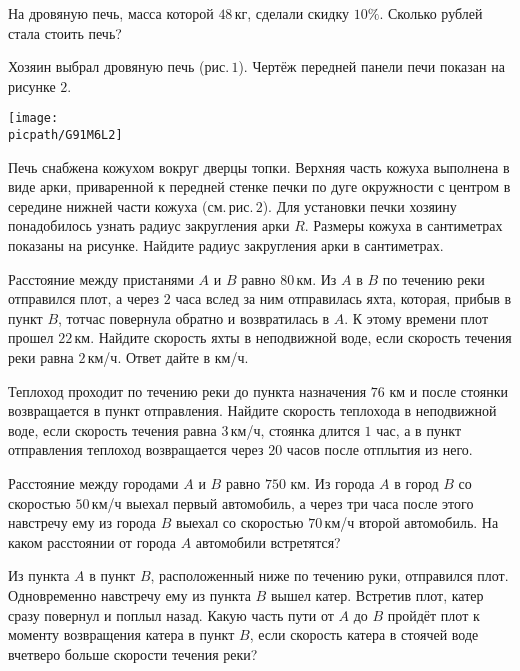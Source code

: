 \begin{class}[number=2]
\begin{listofex}
		\item На дровяную печь, масса которой \( 48 \) кг, сделали скидку \( 10\% \). Сколько рублей стала стоить печь?
		\item Хозяин выбрал дровяную печь (рис. \( 1 \)). Чертёж передней панели печи показан на рисунке \( 2 \).
		\begin{center}
			\texttt{[image: \\picpath/G91M6L2]}
		\end{center}
		Печь снабжена кожухом вокруг дверцы топки. Верхняя часть кожуха выполнена в виде арки, приваренной к передней стенке печки по дуге окружности с центром в середине нижней части кожуха (см. рис. \( 2 \)). Для установки печки хозяину понадобилось узнать радиус закругления арки \( R \). Размеры кожуха в сантиметрах показаны на рисунке. Найдите радиус закругления арки в сантиметрах.
		\item Расстояние между пристанями \( A \) и \( B \) равно \( 80 \) км. Из \( A \) в \( B \) по течению реки отправился плот, а через \( 2 \) часа вслед за ним отправилась яхта, которая, прибыв в пункт \( B \), тотчас повернула обратно и возвратилась в \( A \). К этому времени плот прошел \( 22 \) км. Найдите скорость яхты в неподвижной воде, если скорость течения реки равна \( 2 \) км/ч. Ответ дайте в км/ч.
		\item Теплоход проходит по течению реки до пункта назначения \( 76  \) км и после стоянки возвращается в пункт отправления. Найдите скорость теплохода в неподвижной воде, если скорость течения равна \( 3 \) км/ч, стоянка длится \( 1 \) час, а в пункт отправления теплоход возвращается через \( 20 \) часов после отплытия из него.
		\item Расстояние между городами \( A \) и \( B \) равно \( 750  \) км. Из города \( A \) в город \( B \) со скоростью \( 50 \) км/ч выехал первый автомобиль, а через три часа после этого навстречу ему из города \( B \) выехал со скоростью \( 70 \) км/ч второй автомобиль. На каком расстоянии от города \( A \) автомобили встретятся?
		\item Из пункта \( A \) в пункт \( B \), расположенный ниже по течению руки, отправился плот. Одновременно навстречу ему из пункта \( B \) вышел катер. Встретив плот, катер сразу повернул и поплыл назад. Какую часть пути от \( A \) до \( B \) пройдёт плот к моменту возвращения катера в пункт \( B \), если скорость катера в стоячей воде вчетверо больше скорости течения реки?	
	\end{listofex}
\end{class}


